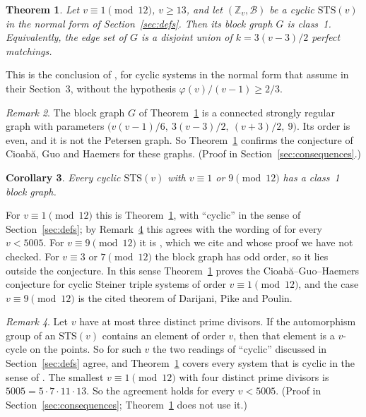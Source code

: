 \documentclass[11pt]{amsart}
\theoremstyle{plain}
\newtheorem{theorem}{Theorem}
\newtheorem{corollary}[theorem]{Corollary}
\theoremstyle{definition}
\theoremstyle{remark}
\newtheorem{remark}[theorem]{Remark}
\numberwithin{equation}{section}
\newcommand{\Z}{\mathbb{Z}}
\newcommand{\cB}{\mathcal{B}}
\newcommand{\STS}{\mathrm{STS}}
\begin{document}
\begin{theorem}\label{thm:main}
Let \(v\equiv 1\pmod{12}\), \(v\ge 13\), and let \((\Z_v,\cB)\) be a cyclic \(\STS(v)\) in the normal form of Section~\ref{sec:defs}. Then its block graph \(G\) is class~1. Equivalently, the edge set of \(G\) is a disjoint union of \(k=3(v-3)/2\) perfect matchings.
\end{theorem}

This is the conclusion of \cite[Theorem~3.1]{DPP}, for cyclic systems in the normal form that \cite{DPP} assume in their Section~3, without the hypothesis \(\varphi(v)/(v-1)\ge 2/3\).

\begin{remark}\label{rem:srg}
The block graph \(G\) of Theorem~\ref{thm:main} is a connected strongly regular graph with parameters \(\bigl(v(v-1)/6,\ 3(v-3)/2,\ (v+3)/2,\ 9\bigr)\). Its order is even, and it is not the Petersen graph. So Theorem~\ref{thm:main} confirms the conjecture of Cioab\u{a}, Guo and Haemers for these graphs. (Proof in Section~\ref{sec:consequences}.)
\end{remark}

\begin{corollary}\label{cor:both}
Every cyclic \(\STS(v)\) with \(v\equiv 1\) or \(9\pmod{12}\) has a class~1 block graph.
\end{corollary}

For \(v\equiv1\pmod{12}\) this is Theorem~\ref{thm:main}, with ``cyclic'' in the sense of Section~\ref{sec:defs}; by Remark~\ref{rem:cyclic} this agrees with the wording of \cite{DPP} for every \(v<5005\). For \(v\equiv9\pmod{12}\) it is \cite[Theorem~4.1]{DPP}, which we cite and whose proof we have not checked. For \(v\equiv3\) or \(7\pmod{12}\) the block graph has odd order, so it lies outside the conjecture. In this sense Theorem~\ref{thm:main} proves the Cioab\u{a}--Guo--Haemers conjecture for cyclic Steiner triple systems of order \(v\equiv1\pmod{12}\), and the case \(v\equiv9\pmod{12}\) is the cited theorem of Darijani, Pike and Poulin.

\begin{remark}\label{rem:cyclic}
Let \(v\) have at most three distinct prime divisors. If the automorphism group of an \(\STS(v)\) contains an element of order \(v\), then that element is a \(v\)-cycle on the points. So for such \(v\) the two readings of ``cyclic'' discussed in Section~\ref{sec:defs} agree, and Theorem~\ref{thm:main} covers every system that is cyclic in the sense of \cite{DPP}. The smallest \(v\equiv1\pmod{12}\) with four distinct prime divisors is \(5005=5\cdot7\cdot11\cdot13\). So the agreement holds for every \(v<5005\). (Proof in Section~\ref{sec:consequences}; Theorem~\ref{thm:main} does not use it.)
\end{remark}
\end{document}
